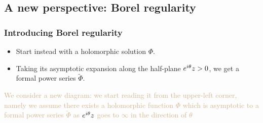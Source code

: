 \documentclass{article}
\let\Re\relax
\DeclareMathOperator{\Re}{Re}
\theoremstyle{definition}
\newcommand{\series}[1]{\tilde{#1}}
\begin{document}
\subsection{A new perspective: Borel regularity}
\subsubsection{Introducing Borel regularity}
\begin{itemize}
\item Start instead with a holomorphic solution $\Phi$.
\item Taking its asymptotic expansion along the half-plane $\Re e^{i\theta}z > 0$, we get a formal power series $\series{\Phi}$.
\end{itemize}
\textcolor{Tan}{We consider a new diagram: we start reading it from the upper-left corner, namely we assume there exists a holomorphic function $\Phi$ which is asymptotic to a formal power series $\series{\Phi}$ as $\Re e^{i\theta}z$ goes to $\infty$ in the direction of $\theta$}
\end{document}
